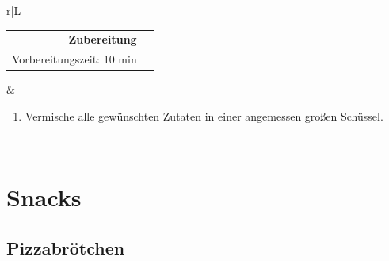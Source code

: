 \documentclass[a4paper, 12pt]{scrbook} 								%
\numberwithin{equation}{section} 									%
\begin{document}
\begin{tabularx}{\textwidth}{r|L}
 
	\begin{tabular}[t]{rr}
		\textbf{Zubereitung}	\\
		\small Vorbereitungszeit: 10 min	\\
	\end{tabular}			&	\begin{enumerate}[]
									\item Vermische alle gewünschten Zutaten in einer angemessen großen Schüssel.
								\end{enumerate}	\\
\end{tabularx}
\newpage


\chapter{Snacks}



	\section{Pizzabrötchen}	\label{pizzabroetchen}
\end{document}
